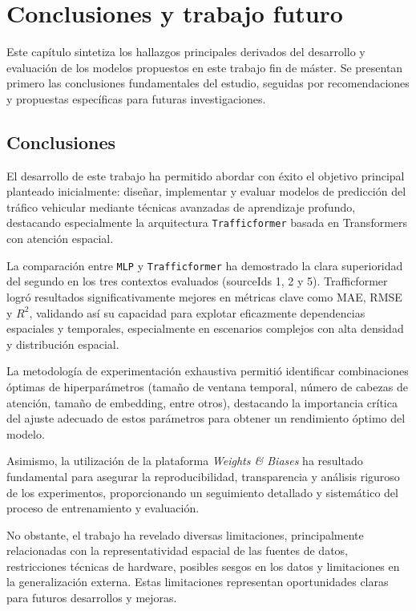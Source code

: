 \section{Conclusiones y trabajo futuro}
\label{sec:conclusiones}

%
%

Este capítulo sintetiza los hallazgos principales derivados del desarrollo y evaluación de los modelos propuestos en este trabajo fin de máster. Se presentan primero las conclusiones fundamentales del estudio, seguidas por recomendaciones y propuestas específicas para futuras investigaciones.

\subsection{Conclusiones}

El desarrollo de este trabajo ha permitido abordar con éxito el objetivo principal planteado inicialmente: diseñar, implementar y evaluar modelos de predicción del tráfico vehicular mediante técnicas avanzadas de aprendizaje profundo, destacando especialmente la arquitectura \texttt{Trafficformer} basada en Transformers con atención espacial.

La comparación entre \texttt{MLP} y \texttt{Trafficformer} ha demostrado la clara superioridad del segundo en los tres contextos evaluados (sourceIds 1, 2 y 5). Trafficformer logró resultados significativamente mejores en métricas clave como MAE, RMSE y $R^2$, validando así su capacidad para explotar eficazmente dependencias espaciales y temporales, especialmente en escenarios complejos con alta densidad y distribución espacial.

La metodología de experimentación exhaustiva permitió identificar combinaciones óptimas de hiperparámetros (tamaño de ventana temporal, número de cabezas de atención, tamaño de embedding, entre otros), destacando la importancia crítica del ajuste adecuado de estos parámetros para obtener un rendimiento óptimo del modelo.

Asimismo, la utilización de la plataforma \textit{Weights \& Biases} ha resultado fundamental para asegurar la reproducibilidad, transparencia y análisis riguroso de los experimentos, proporcionando un seguimiento detallado y sistemático del proceso de entrenamiento y evaluación.

No obstante, el trabajo ha revelado diversas limitaciones, principalmente relacionadas con la representatividad espacial de las fuentes de datos, restricciones técnicas de hardware, posibles sesgos en los datos y limitaciones en la generalización externa. Estas limitaciones representan oportunidades claras para futuros desarrollos y mejoras.

